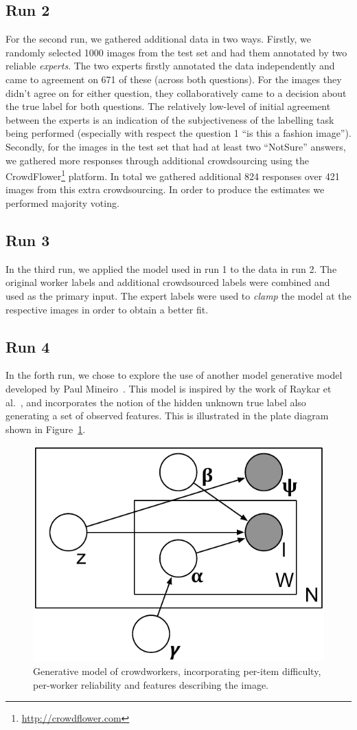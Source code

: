 \documentclass{../acm_proc_article-me11_tweaked}
\begin{document}
\subsection{Run 2}
For the second run, we gathered additional data in two ways. Firstly, we randomly selected 1000 images from the test set and had them annotated by two reliable \emph{experts}. The two experts firstly annotated the data independently and came to agreement on 671 of these (across both questions). For the images they didn't agree on for either question, they collaboratively came to a decision about the true label for both questions. The relatively low-level of initial agreement between the experts is an indication of the subjectiveness of the labelling task being performed (especially with respect the question 1 ``is this a fashion image''). Secondly, for the images in the test set that had at least two ``NotSure'' answers, we gathered more responses through additional crowdsourcing using the CrowdFlower\footnote{\url{http://crowdflower.com}} platform. In total we gathered additional 824 responses over 421 images from this extra crowdsourcing. In order to produce the estimates we performed majority voting. 

\subsection{Run 3}
In the third run, we applied the model used in run 1 to the data in run 2. The original worker labels and additional crowdsourced labels were combined and used as the primary input. The expert labels were used to \emph{clamp} the model at the respective images in order to obtain a better fit.

\subsection{Run 4}
In the forth run, we chose to explore the use of another model generative model developed by Paul Mineiro~\cite{Mineiro20111116}. This model is inspired by the work of Raykar et al.~\cite{Raykar:2010:LC:1756006.1859894}, and incorporates the notion of the hidden unknown true label also generating a set of observed features. This is illustrated in the plate diagram shown in Figure~\ref{fig:model2}.

\begin{figure}
	\centering
	\includegraphics[width=0.6\columnwidth]{images/model2}
	\caption{\label{fig:model2}Generative model of crowdworkers, incorporating per-item difficulty, per-worker reliability and features describing the image.}
\end{figure}
\end{document}
